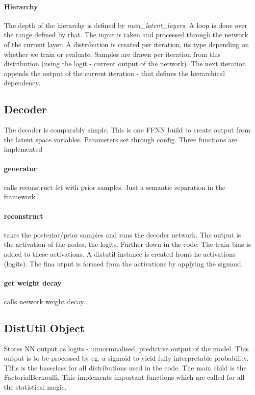 \paragraph{Hierarchy} The depth of the hierarchy is defined by
\emph{num\_latent\_layers}. A loop is done over the range defined by that. The
input is taken and processed through the network of the current layer. A
distribution is created per iteration, its type depending on whether we train or
evaluate. Samples are drawn per iteration from this distribution (using the
logit - current output of the network). The next iteration appends the output of
the current iteration - that defines the hierarchical dependency. 

\subsection{Decoder}
The decoder is comparably simple. This is one FFNN build to create output from
the latent space variables. Parameters set through config. Three functions are
implemented \paragraph{generator} calls reconstruct fct with prior samples. Just
a semantic separation in the framework \paragraph{reconstruct} takes the
posterior/prior samples and runs the decoder network. The output is the
activation of the nodes, the logits. Further down in the code: The train bias is
added to these activations. A distutil instance is created fromt he activations
(logits). The fina utput is formed from the activations by applying the sigmoid.


\paragraph{get weight decay} calls network weight decay.

\subsection{DistUtil Object}
Stores NN output as logits - unnormnalised, predictive output of the model. This
output is to be processed by eg. a sigmoid to yield fully interpretable
probability. THis is the baseclass for all distributions used in the code. The
main child is the FactorialBernoulli. This implements important functions which
are called for all the statistical magic.

